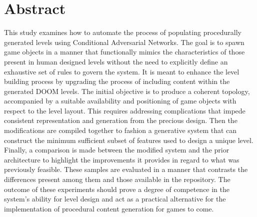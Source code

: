 \documentclass{Configuration_Files/PoliMi3i_thesis}
\begin{document}


\pagestyle{empty} %
\frontmatter %


\startpreamble
\setcounter{page}{1} %

\chapter*{Abstract} 
This study examines how to automate the process of populating procedurally 
generated levels using Conditional Adversarial Networks. The goal is to spawn 
game objects in a manner that functionally mimics the characteristics of those present 
in human designed levels without the need to explicitly define an exhaustive set of
rules to govern the system. It is meant to enhance the level building process by 
upgrading the process of including content within the generated DOOM levels. The initial 
objective is to produce a coherent topology, accompanied by a suitable availability and 
positioning of game objects with respect to the level layout. This requires addressing 
complications that impede consistent representation and generation from the precious 
design. Then the modifications are compiled together to fashion a generative system 
that can construct the minimum sufficient subset of features used to design a unique level. 
Finally, a comparison is made between the modified system and the prior architecture to 
highlight the improvements it provides in regard to what was previously feasible.
These samples are evaluated in a manner that contrasts the differences present 
among them and those available in the repository. The outcome of these experiments 
should prove a degree of competence in the system’s ability for level design and act 
as a practical alternative for the implementation of procedural content generation for 
games to come.
\\
\\
\end{document}
